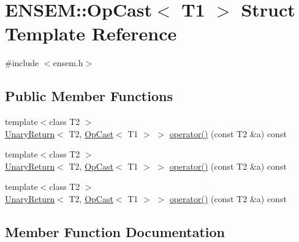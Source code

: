 \hypertarget{structENSEM_1_1OpCast}{}\section{E\+N\+S\+EM\+:\+:Op\+Cast$<$ T1 $>$ Struct Template Reference}
\label{structENSEM_1_1OpCast}


{\ttfamily \#include $<$ensem.\+h$>$}

\subsection*{Public Member Functions}
\begin{DoxyCompactItemize}
\item 
{\footnotesize template$<$class T2 $>$ }\\\mbox{\hyperlink{structENSEM_1_1UnaryReturn}{Unary\+Return}}$<$ T2, \mbox{\hyperlink{structENSEM_1_1OpCast}{Op\+Cast}}$<$ T1 $>$ $>$ \mbox{\hyperlink{structENSEM_1_1OpCast_a330c92c529ef7bba55e2b3cbbbf0c81a}{operator()}} (const T2 \&a) const
\item 
{\footnotesize template$<$class T2 $>$ }\\\mbox{\hyperlink{structENSEM_1_1UnaryReturn}{Unary\+Return}}$<$ T2, \mbox{\hyperlink{structENSEM_1_1OpCast}{Op\+Cast}}$<$ T1 $>$ $>$ \mbox{\hyperlink{structENSEM_1_1OpCast_a330c92c529ef7bba55e2b3cbbbf0c81a}{operator()}} (const T2 \&a) const
\item 
{\footnotesize template$<$class T2 $>$ }\\\mbox{\hyperlink{structENSEM_1_1UnaryReturn}{Unary\+Return}}$<$ T2, \mbox{\hyperlink{structENSEM_1_1OpCast}{Op\+Cast}}$<$ T1 $>$ $>$ \mbox{\hyperlink{structENSEM_1_1OpCast_a330c92c529ef7bba55e2b3cbbbf0c81a}{operator()}} (const T2 \&a) const
\end{DoxyCompactItemize}


\subsection{Member Function Documentation}
\mbox{\label{structENSEM_1_1OpCast_a330c92c529ef7bba55e2b3cbbbf0c81a}} 
